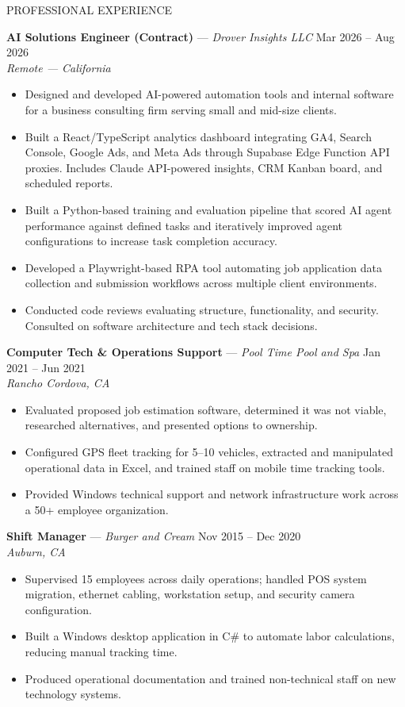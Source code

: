 \documentclass{resume}
\begin{document}
\begin{rSection}{PROFESSIONAL EXPERIENCE}

\textbf{AI Solutions Engineer (Contract)} --- \textit{Drover Insights LLC} \hfill Mar 2026 -- Aug 2026 \\
\textit{Remote --- California}
\begin{itemize}
    \item Designed and developed AI-powered automation tools and internal software for a business consulting firm serving small and mid-size clients.
    \item Built a React/TypeScript analytics dashboard integrating GA4, Search Console, Google Ads, and Meta Ads through Supabase Edge Function API proxies. Includes Claude API-powered insights, CRM Kanban board, and scheduled reports.
    \item Built a Python-based training and evaluation pipeline that scored AI agent performance against defined tasks and iteratively improved agent configurations to increase task completion accuracy.
    \item Developed a Playwright-based RPA tool automating job application data collection and submission workflows across multiple client environments.
    \item Conducted code reviews evaluating structure, functionality, and security. Consulted on software architecture and tech stack decisions.
\end{itemize}

\textbf{Computer Tech \& Operations Support} --- \textit{Pool Time Pool and Spa} \hfill Jan 2021 -- Jun 2021 \\
\textit{Rancho Cordova, CA}
\begin{itemize}
    \item Evaluated proposed job estimation software, determined it was not viable, researched alternatives, and presented options to ownership.
    \item Configured GPS fleet tracking for 5--10 vehicles, extracted and manipulated operational data in Excel, and trained staff on mobile time tracking tools.
    \item Provided Windows technical support and network infrastructure work across a 50+ employee organization.
\end{itemize}

\textbf{Shift Manager} --- \textit{Burger and Cream} \hfill Nov 2015 -- Dec 2020 \\
\textit{Auburn, CA}
\begin{itemize}
    \item Supervised 15 employees across daily operations; handled POS system migration, ethernet cabling, workstation setup, and security camera configuration.
    \item Built a Windows desktop application in C\# to automate labor calculations, reducing manual tracking time.
    \item Produced operational documentation and trained non-technical staff on new technology systems.
\end{itemize}

\end{rSection}
\end{document}
